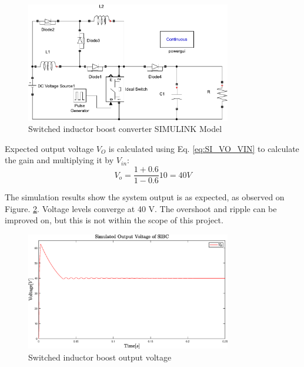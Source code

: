 \begin{figure} [H]
   \centering
   \includegraphics[width=0.8\textwidth]{figures/bSwitchedInductor/Model_SI.pdf}
    \caption{Switched inductor boost converter SIMULINK Model}
	\label{fig:Model_SI}
\end{figure}

Expected output voltage $V_O$ is calculated using Eq. \ref{eq:SI_VO_VIN} to calculate the gain and multiplying it by $V_{in}$: 
\begin{equation}
	{V_o}= \frac{1+0.6}{1-0.6}10=40V
	\label{eq:Simulation_SI}
\end{equation}

The simulation results show the system output is as expected, as observed on Figure. \ref{fig:Simulation_SI}. Voltage levels converge at 40 V. The overshoot and ripple can be improved on, but this is not within the scope of this project. 


\begin{figure} [H]
   \centering
   \includegraphics[width=0.8\textwidth]{figures/bSwitchedInductor/Simulation_SI.eps}
    \caption{Switched inductor boost output voltage}
	\label{fig:Simulation_SI}
\end{figure}
